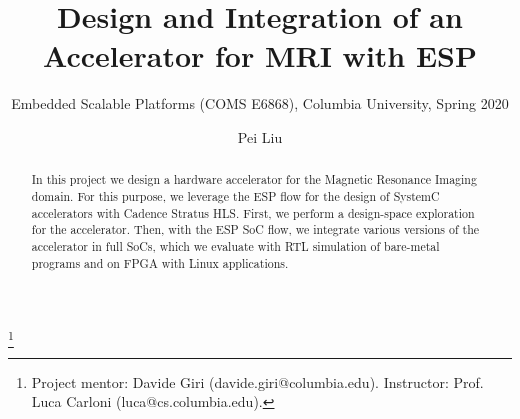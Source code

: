 \documentclass[sigconf, nonacm, screen]{acmart}
\begin{document}
\title{Design and Integration of an Accelerator for MRI with ESP}
\subtitle{Embedded Scalable Platforms (COMS E6868), Columbia University, Spring 2020}

\author{Pei Liu}
\thanks{Project mentor: Davide Giri (davide.giri@columbia.edu). Instructor:
  Prof. Luca Carloni (luca@cs.columbia.edu).}

\begin{abstract}
In this project we design a hardware accelerator for the Magnetic Resonance
Imaging domain. For this purpose, we leverage the ESP flow for the design of
SystemC accelerators with Cadence Stratus HLS. First, we perform a design-space
exploration for the accelerator. Then, with the ESP SoC flow, we integrate
various versions of the accelerator in full SoCs, which we evaluate with RTL
simulation of bare-metal programs and on FPGA with Linux applications.
\end{abstract}

\maketitle











\end{document}
